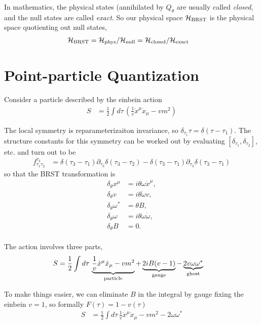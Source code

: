 \documentclass[notitlepage,amsmath,amssymb,aps, pra, 10pt]{revtex4-1}
\begin{document}
    In mathematics, the physical states (annihilated by $Q_{\theta}$ are usually called \emph{closed}, and the null states are called \emph{exact}. So our physical space $\mathcal{H}_{\rm BRST}$ is the physical space quotienting out null states,
    \begin{align}
        \mathcal{H}_{\rm BRST} &=  \mathcal{H}_{\rm phys} / \mathcal{H}_{\rm null}   = \mathcal{H}_{\rm closed} / \mathcal{H}_{\rm exact}
    \end{align}

\section{Point-particle Quantization}
    Consider a particle described by the einbein action
    \begin{align}
        S &= \frac{1}{2} \int d\tau \, \left(\frac{1}{v}\dot x^{\mu}\dot x_{\mu} - v m^2  \right)
    \end{align}

    The local symmetry is reparameterizaiton invariance, so $\delta_{\tau_1} \tau = \delta(\tau -\tau_1)$. The structure constants for this symmetry can be worked out by evaluating $[\delta_{\tau_1}, \delta_{\tau_2}]$, etc. and turn out to be
    \begin{align}
      f^{\tau_3}_{\tau_1 \tau_2} &= \delta(\tau_3-\tau_1)\partial_{\tau_3} \delta(\tau_3 - \tau_2) -\delta(\tau_3-\tau_1)\partial_{\tau_3} \delta(\tau_3 - \tau_1)
    \end{align}
    so that the BRST transformation is
    \begin{align}
    \delta_{\theta}x^{\mu} &= i \theta\omega \dot x^{\mu},\\
    \delta_{\theta}v &= i \theta\dot \omega v,\\
    \delta_{\theta}\omega^* &=  \theta B,\\
    \delta_{\theta}\omega &= i \theta\omega \dot \omega,\\
    \delta_{\theta} B &=0.\\
    \end{align}

    The action involves three parts,
    \begin{align}
        S &= \frac{1}{2} \int d\tau \, \underbrace{\frac{1}{v}\dot x^{\mu}\dot x_{\mu} - v m^2}_{\rm particle}  +\underbrace{2iB(v-1)}_{\rm gauge} - \underbrace{2v\omega \omega^*}_{\rm ghost}
    \end{align}

    To make things easier, we can eliminate $B$ in the integral by gauge fixing  the einbein $v=1$, so formally $F(\tau) = 1 - v(\tau)$
    \begin{align}
        S &= \frac{1}{2} \int d\tau \, \frac{1}{v}\dot x^{\mu}\dot x_{\mu} - v m^2-2\omega \omega^*
    \end{align}
\end{document}
